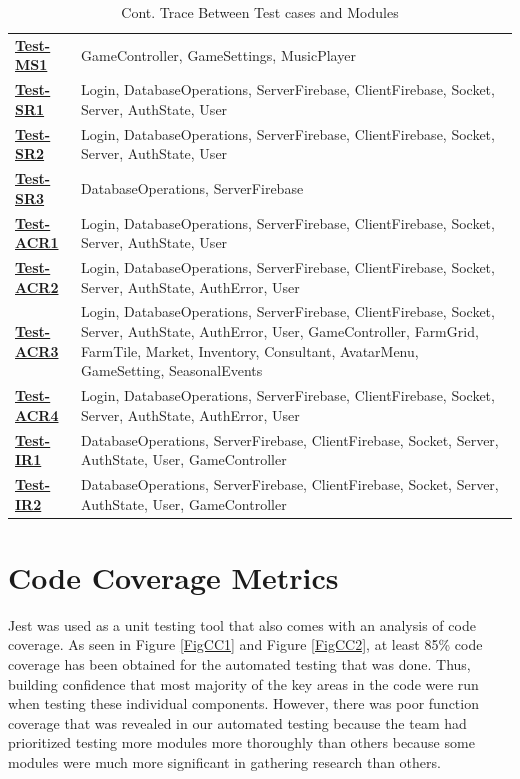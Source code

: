 \documentclass[12pt, titlepage]{article}
\begin{document}
\begin{table}[H]
\centering
\begin{tabular}{p{} p{}}
\toprule
\hyperref[Test-MS1]{\textbf{Test-MS1}} &   GameController, GameSettings, MusicPlayer\\
\hyperref[Test-SR1]{\textbf{Test-SR1}} &  Login, DatabaseOperations, ServerFirebase, ClientFirebase, Socket, Server, AuthState, User\\
\hyperref[Test-SR2]{\textbf{Test-SR2}} &  Login, DatabaseOperations, ServerFirebase, ClientFirebase, Socket, Server, AuthState, User\\
\hyperref[Test-SR3]{\textbf{Test-SR3}} &    DatabaseOperations, ServerFirebase\\
\hyperref[Test-ACR1]{\textbf{Test-ACR1}} &    Login, DatabaseOperations, ServerFirebase, ClientFirebase, Socket, Server, AuthState, User\\
\hyperref[Test-ACR2]{\textbf{Test-ACR2}} &    Login, DatabaseOperations, ServerFirebase, ClientFirebase, Socket, Server, AuthState, AuthError, User\\
\hyperref[Test-ACR3]{\textbf{Test-ACR3}} &    Login, DatabaseOperations, ServerFirebase, ClientFirebase, Socket, Server, AuthState, AuthError, User, GameController, FarmGrid, FarmTile, Market, Inventory, Consultant, AvatarMenu, GameSetting, SeasonalEvents\\
\hyperref[Test-ACR4]{\textbf{Test-ACR4}} &    Login, DatabaseOperations, ServerFirebase, ClientFirebase, Socket, Server, AuthState, AuthError, User\\
\hyperref[Test-IR1]{\textbf{Test-IR1}} &     DatabaseOperations, ServerFirebase, ClientFirebase, Socket, Server, AuthState, User, GameController\\
\hyperref[Test-IR2]{\textbf{Test-IR2}} &     DatabaseOperations, ServerFirebase, ClientFirebase, Socket, Server, AuthState, User, GameController\\
\bottomrule
\end{tabular}
\caption{Cont. Trace Between Test cases and Modules}
\label{TblRT}
\end{table}

\section{Code Coverage Metrics}
Jest was used as a unit testing tool that also comes with an analysis of code coverage. As seen in Figure \ref{FigCC1} and Figure \ref{FigCC2}, at least 85\% code coverage has been obtained for the automated testing that was done. Thus, building confidence that most majority of the key areas in the code were run when testing these individual components. However, there was poor function coverage that was revealed in our automated testing because the team had prioritized testing more modules more thoroughly than others because some modules were much more significant in gathering research than others. 
\end{document}
